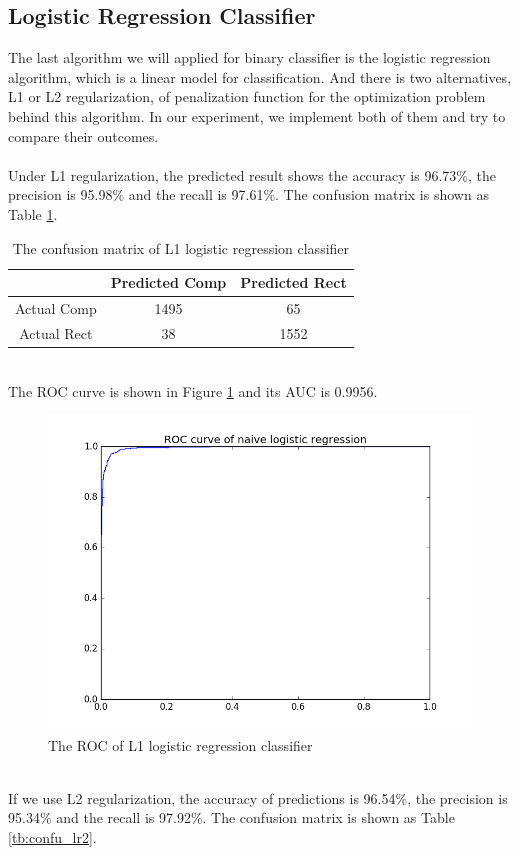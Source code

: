 \documentclass{article}
\begin{document}
\subsection{Logistic Regression Classifier}
The last algorithm we will applied for binary classifier is the logistic regression algorithm, which is a linear model for classification. And there is two alternatives, L1 or L2 regularization, of penalization function for the optimization problem behind this algorithm. In our experiment, we implement both of them and try to compare their outcomes.\\
\\
Under L1 regularization, the predicted result shows the accuracy is 96.73\%, the precision is 95.98\% and the recall is 97.61\%. The confusion matrix is shown as Table \ref{tb:confu_lr1}.\\
\begin{table}
\begin{center}
\caption{The confusion matrix of L1 logistic regression classifier}
\label{tb:confu_lr1}
\begin{tabular}{|c|c|c|}
\hline
& Predicted Comp& Predicted Rect\\
\hline
Actual Comp&1495&65\\
\hline
Actual Rect&38&1552\\
\hline
\end{tabular}
\end{center}
\end{table}
\\
The ROC curve is shown in Figure \ref{fig:roc_lr1} and its AUC is 0.9956.\\
\begin{figure}[htbp]
\centering
\includegraphics[width=.6\textwidth]{h_logistic_regression_l1_roc.png}
\caption{The ROC of L1 logistic regression classifier}
\label{fig:roc_lr1}
\end{figure}
\\
If we use L2 regularization, the accuracy of predictions is 96.54\%, the precision is 95.34\% and the recall is 97.92\%. The confusion matrix is shown as Table \ref{tb:confu_lr2}.\\
\end{document}

